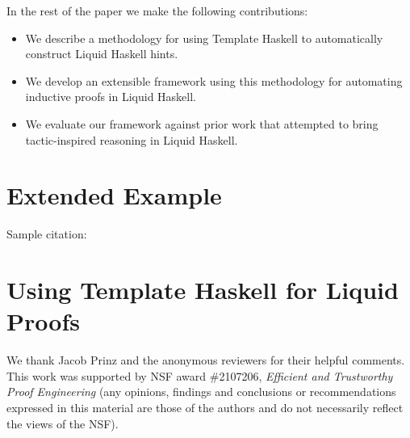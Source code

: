 \documentclass[sigplan,screen]{acmart}
\begin{document}
In the rest of the paper we make the following contributions:
\begin{itemize}
\item We describe a methodology for using Template Haskell to automatically construct Liquid Haskell hints.
\item We develop an extensible framework using this methodology for automating inductive proofs in Liquid Haskell.
\item We evaluate our framework against prior work that attempted to
  bring tactic-inspired reasoning in Liquid Haskell.
\end{itemize}

\section{Extended Example}


Sample citation: \cite{liu20typeclasses}

\section{Using Template Haskell for Liquid Proofs}






\begin{acks}
  We thank Jacob Prinz and the anonymous reviewers for their helpful
  comments.  This work was supported by NSF award \#2107206, {\em
    Efficient and Trustworthy Proof Engineering} (any opinions,
  findings and conclusions or recommendations expressed in this
  material are those of the authors and do not necessarily reflect the
  views of the NSF).
\end{acks}





\end{document}
